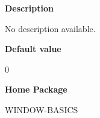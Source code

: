  
{\bf Description}

No description available.

 
{\bf Default value}

0

 
{\bf Home Package}

WINDOW-BASICS

